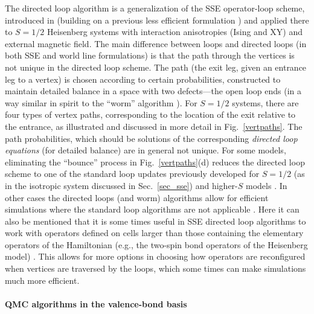 \documentclass[draft,numberedheadings]{aipproc}
\begin{document}
The directed loop algorithm is a generalization of the SSE operator-loop scheme, introduced in \cite{syljuasen02} (building on a previous
less efficient formulation \cite{sandvik99a}) and applied there to $S=1/2$ Heisenberg systems with interaction anisotropies (Ising and XY) 
and external magnetic field. The main difference between loops and directed loops (in both SSE and world line formulations) is that the path 
through the vertices is not unique in the directed loop scheme. The path (the exit leg, given an entrance leg to a vertex) is chosen according 
to certain probabilities, constructed to maintain detailed balance in a space with two defects---the open loop ends (in a way similar in spirit 
to the ``worm'' algorithm \cite{prokofev96}). For $S=1/2$ systems, there are four types of vertex paths, corresponding to the location of 
the exit relative to the entrance, as illustrated and discussed in more detail in Fig.~\ref{vertpaths}. The path probabilities, which should 
be solutions of the corresponding {\it directed loop equations} (for detailed balance) are in general not unique. For some models, eliminating 
the ``bounce'' process in Fig.~\ref{vertpaths}(d) reduces the directed loop scheme to one of the standard loop updates previously developed for 
$S=1/2$ (as in the isotropic system discussed in Sec.~\ref{sec_sse}) and higher-$S$ models \cite{evertz93,evertz1,kawashima94}. In other cases the 
directed loops (and worm) algorithms allow for efficient simulations where the standard loop algorithms are not applicable 
\cite{syljuasen02,syljuasen03,kawashima04,melko05}. Here it can also be mentioned that it is some times useful in SSE directed loop algorithms
to work with operators defined on cells larger than those containing the elementary operators of the Hamiltonian (e.g., the two-spin bond 
operators of the Heisenberg model)  \cite{louis04}. This allows for more options in choosing how operators are reconfigured when vertices
are traversed by the loops, which some times can make simulations much more efficient.

\paragraph{QMC algorithms in the valence-bond basis}
\end{document}
